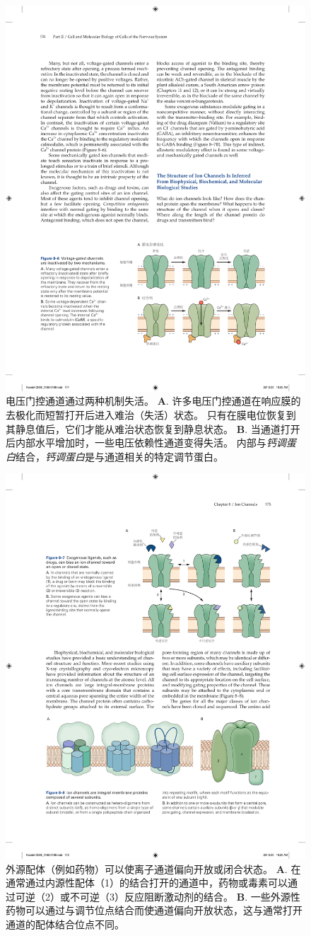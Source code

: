 \begin{figure}[htbp]
	\centering
	\includegraphics[width=0.6\linewidth]{chap08/fig_8_6}
	\caption{电压门控通道通过两种机制失活。
		\textbf{A}. 许多电压门控通道在响应膜的去极化而短暂打开后进入难治（失活）状态。
		只有在膜电位恢复到其静息值后，它们才能从难治状态恢复到静息状态。
		\textbf{B}. 当通道打开后内部水平增加时，一些电压依赖性通道变得失活。
		内部与\textit{钙调蛋白}结合，\textit{钙调蛋白}是与通道相关的特定调节蛋白。}
	\label{fig:8_6}
\end{figure}


\begin{figure}[htbp]
	\centering
	\includegraphics[width=0.7\linewidth]{chap08/fig_8_7}
	\caption{外源配体（例如药物）可以使离子通道偏向开放或闭合状态。
		\textbf{A}. 在通常通过内源性配体（1）的结合打开的通道中，药物或毒素可以通过可逆（2）或不可逆（3）反应阻断激动剂的结合。
		\textbf{B}. 一些外源性药物可以通过与调节位点结合而使通道偏向开放状态，这与通常打开通道的配体结合位点不同。}
	\label{fig:8_7}
\end{figure}



